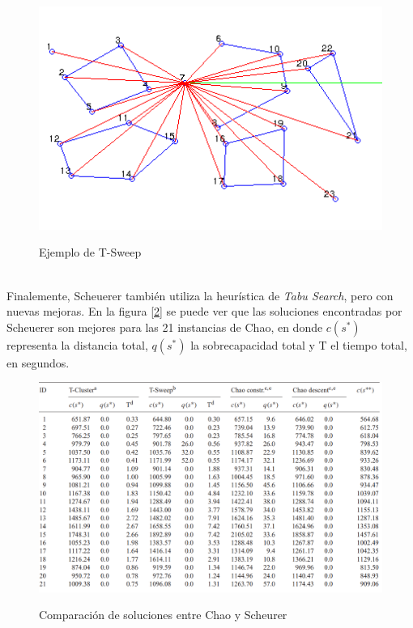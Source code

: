 \documentclass[letter, 10pt]{article}
\begin{document}
\begin{figure}[h]
    \centering
    \caption{Ejemplo de T-Sweep}
    \includegraphics[scale=0.5]{Images/sweep.png}
    \label{fig:sweep}
\end{figure}
\\
Finalemente, Scheuerer \cite{Scheuerer} también utiliza  la heurística de \textit{Tabu Search}, pero con nuevas mejoras. En la figura [\ref{fig:tabla}] se puede ver que las soluciones encontradas por Scheuerer son mejores para las 21 instancias de Chao, en donde $c(s^{*})$ representa la distancia total, $q(s^{*})$ la sobrecapacidad total y T el tiempo total, en segundos.
\begin{figure}[h]
    \centering
    \caption{Comparación de soluciones entre Chao y Scheurer}
    \includegraphics[scale=0.6]{Images/Chao-Scheurer.png}
    \label{fig:tabla}
\end{figure}
\newpage
\end{document}
